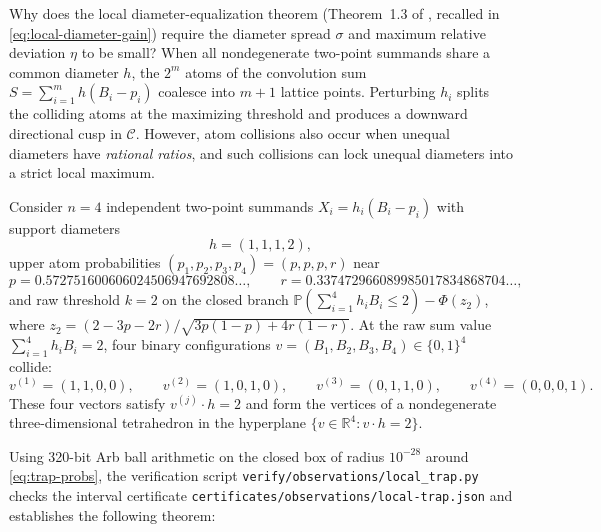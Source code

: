 \documentclass[11pt]{article}
\numberwithin{equation}{section}
\theoremstyle{definition}
\theoremstyle{remark}
\newcommand{\Pp}{\mathbb P}
\newcommand{\R}{\mathbb R}
\begin{document}
Why does the local diameter-equalization theorem
(Theorem~1.3 of \citealp{BellBernoulli2026}, recalled in
\eqref{eq:local-diameter-gain}) require the diameter spread $\sigma$ and
maximum relative deviation $\eta$ to be small? When all nondegenerate
two-point summands share a common diameter $h$, the $2^m$ atoms of the
convolution sum $S=\sum_{i=1}^m h(B_i-p_i)$ coalesce into $m+1$ lattice points.
Perturbing $h_i$ splits the colliding atoms at the maximizing threshold and
produces a downward directional cusp in $\mathcal C$. However, atom collisions
also occur when unequal diameters have \emph{rational ratios}, and such
collisions can lock unequal diameters into a strict local maximum.

Consider $n=4$ independent two-point summands $X_i=h_i(B_i-p_i)$ with support
diameters
\begin{equation}\label{eq:trap-diameters}
 h=(1,1,1,2),
\end{equation}
upper atom probabilities $(p_1,p_2,p_3,p_4)=(p,p,p,r)$ near
\begin{equation}\label{eq:trap-probs}
 p=0.572751600606024506947692808\ldots,\qquad
 r=0.337472966089985017834868704\ldots,
\end{equation}
and raw threshold $k=2$ on the closed branch
$\Pp(\sum_{i=1}^4 h_i B_i\le 2)-\Phi(z_2)$, where
$z_2=(2-3p-2r)/\sqrt{3p(1-p)+4r(1-r)}$. At the raw sum value
$\sum_{i=1}^4 h_i B_i=2$, four binary configurations $v=(B_1,B_2,B_3,B_4)\in\{0,1\}^4$
collide:
\begin{equation}\label{eq:collision-vertices}
 v^{(1)}=(1,1,0,0),\qquad
 v^{(2)}=(1,0,1,0),\qquad
 v^{(3)}=(0,1,1,0),\qquad
 v^{(4)}=(0,0,0,1).
\end{equation}
These four vectors satisfy $v^{(j)}\cdot h=2$ and form the vertices of a
nondegenerate three-dimensional tetrahedron in the hyperplane
$\{v\in\R^4:v\cdot h=2\}$.

Using 320-bit Arb ball arithmetic on the closed box of radius $10^{-28}$ around
\eqref{eq:trap-probs}, the verification script
\texttt{verify/\allowbreak observations/\allowbreak local\_\allowbreak trap.py}
checks the interval certificate
\texttt{certificates/\allowbreak observations/\allowbreak local-\allowbreak trap.json}
and establishes the following theorem:
\end{document}
